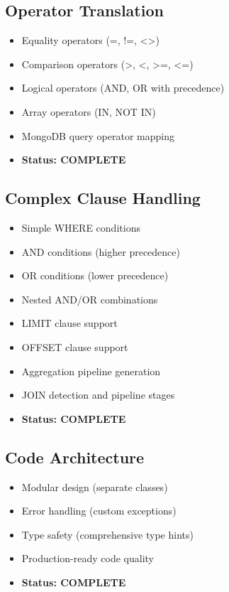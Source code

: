 \documentclass[12pt,a4paper]{article}
\begin{document}
\subsection{Operator Translation}
\begin{itemize}
    \item[$\checkmark$] Equality operators (=, !=, <>)
    \item[$\checkmark$] Comparison operators (>, <, >=, <=)
    \item[$\checkmark$] Logical operators (AND, OR with precedence)
    \item[$\checkmark$] Array operators (IN, NOT IN)
    \item[$\checkmark$] MongoDB query operator mapping
    \item \textbf{Status: COMPLETE}
\end{itemize}

\subsection{Complex Clause Handling}
\begin{itemize}
    \item[$\checkmark$] Simple WHERE conditions
    \item[$\checkmark$] AND conditions (higher precedence)
    \item[$\checkmark$] OR conditions (lower precedence)
    \item[$\checkmark$] Nested AND/OR combinations
    \item[$\checkmark$] LIMIT clause support
    \item[$\checkmark$] OFFSET clause support
    \item[$\checkmark$] Aggregation pipeline generation
    \item[$\checkmark$] JOIN detection and pipeline stages
    \item \textbf{Status: COMPLETE}
\end{itemize}

\subsection{Code Architecture}
\begin{itemize}
    \item[$\checkmark$] Modular design (separate classes)
    \item[$\checkmark$] Error handling (custom exceptions)
    \item[$\checkmark$] Type safety (comprehensive type hints)
    \item[$\checkmark$] Production-ready code quality
    \item \textbf{Status: COMPLETE}
\end{itemize}
\end{document}
